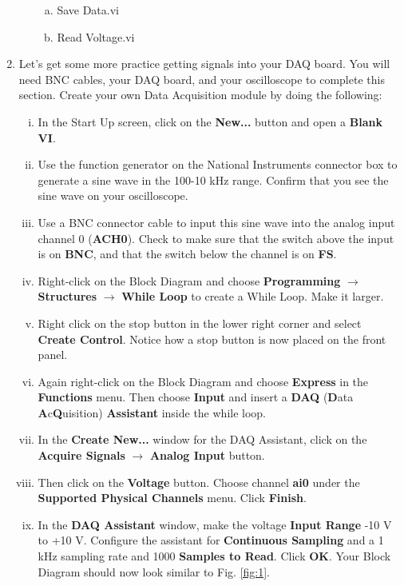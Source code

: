 \documentclass[12pt]{article}
\begin{document}
\begin{enumerate}[1.]
\begin{enumerate}[i.]
\begin{enumerate}[a.]
			\item Save Data.vi
			\item Read Voltage.vi
		\end{enumerate}
	\end{enumerate}
	\item Let's get some more practice getting signals into your DAQ board. You will need BNC cables, your DAQ board, and your oscilloscope to complete this section. Create your own Data Acquisition module by doing the following:
	\begin{enumerate}[i.]
		\item In the Start Up screen, click on the \textbf{New...} button and open a \textbf{Blank VI}.
		\item Use the function generator on the National Instruments connector box to generate a sine wave in the 100-10 kHz range. Confirm that you see the sine wave on your oscilloscope.
		\item Use a BNC connector cable to input this sine wave into the analog input channel 0 (\textbf{ACH0}). Check to make sure that the switch above the input is on \textbf{BNC}, and that the switch below the channel is on \textbf{FS}.
		\item Right-click on the Block Diagram and choose \textbf{Programming} $\rightarrow$ \textbf{Structures} $\rightarrow$ \textbf{While Loop} to create a While Loop. Make it larger.
		\item Right click on the stop button in the lower right corner and select {\bf Create Control}. Notice how a stop button is now placed on the front panel.
		\item Again right-click on the Block Diagram and choose \textbf{Express} in the \textbf{Functions} menu. Then choose \textbf{Input} and insert a \textbf{DAQ} (\textbf{D}ata \textbf{A}c\textbf{Q}uisition) \textbf{Assistant} inside the while loop.
		\item In the \textbf{Create New...} window for the DAQ Assistant, click on the {\bf Acquire Signals} $\rightarrow$ \textbf{Analog Input} button.
		\item Then click on the \textbf{Voltage} button. Choose channel \textbf{ai0} under the \textbf{Supported Physical Channels} menu. Click \textbf{Finish}.
		\item In the \textbf{DAQ Assistant} window, make the voltage \textbf{Input Range} -10 V to +10 V. 
		Configure the assistant for \textbf{Continuous Sampling} and a 1 kHz sampling rate and 1000 {\bf Samples to Read}. Click \textbf{OK}. Your Block Diagram should now look similar to Fig. \ref{fig:1}.
	\end{enumerate}
	

\end{enumerate}
\end{document}
